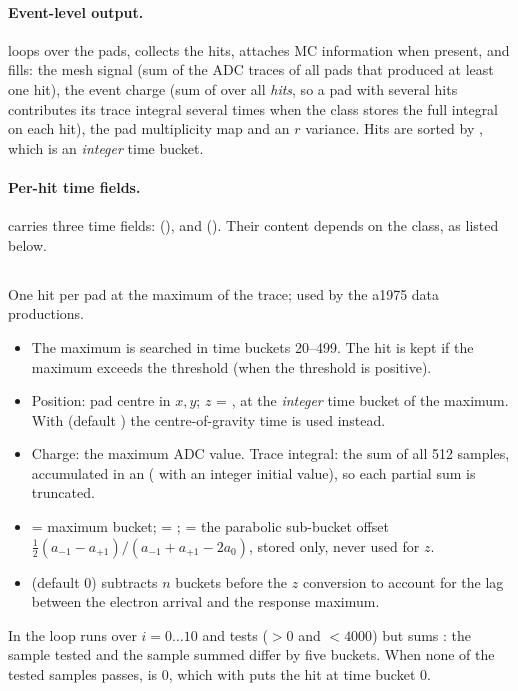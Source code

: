 \paragraph{Event-level output.}  loops over the pads, collects the hits,
attaches MC information when present, and fills: the mesh signal (sum of the ADC traces of all pads
that produced at least one hit), the event charge (sum of  over all
\emph{hits}, so a pad with several hits contributes its trace integral several times when the class
stores the full integral on each hit), the pad multiplicity map and an $r$ variance. Hits are
sorted by , which is an \emph{integer} time bucket.

\paragraph{Per-hit time fields.}  carries three time fields: 
(),  and  (). Their
content depends on the class, as listed below.

\subsection{}

One hit per pad at the maximum of the trace; used by the a1975 data productions.
\begin{itemize}
  \item The maximum is searched in time buckets 20--499. The hit is kept if the maximum exceeds the
        threshold (when the threshold is positive).
  \item Position: pad centre in $x,y$; $z$ = , at the
        \emph{integer} time bucket of the maximum. With  (default
        ) the centre-of-gravity time  is used instead.
  \item Charge: the maximum ADC value. Trace integral: the sum of all 512 samples, accumulated in an
         ( with an integer initial value), so each partial sum is
        truncated.
  \item {} = maximum bucket;  = ;
         = the parabolic sub-bucket offset
        $\frac{1}{2}(a_{-1}-a_{+1})/(a_{-1}+a_{+1}-2a_0)$, stored only, never used for $z$.
  \item {} (default 0) subtracts $n$ buckets before the $z$ conversion to
        account for the lag between the electron arrival and the response maximum.
\end{itemize}
In  the loop runs over $i = 0\ldots10$ and tests
 ($>0$ and $<4000$) but sums : the sample tested and the
sample summed differ by five buckets. When none of the tested samples passes,  is 0,
which with  puts the hit at time bucket 0.

